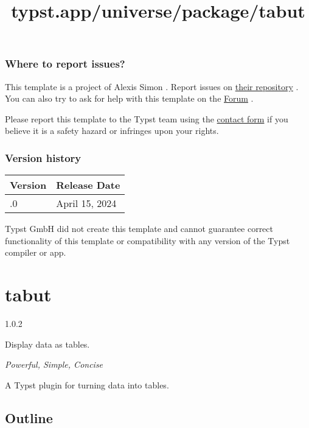 \subsubsection{Where to report issues?}\label{where-to-report-issues}

This template is a project of Alexis Simon . Report issues on
\href{https://codeberg.org/alxsim/superb-pci}{their repository} . You
can also try to ask for help with this template on the
\href{https://forum.typst.app}{Forum} .

Please report this template to the Typst team using the
\href{https://typst.app/contact}{contact form} if you believe it is a
safety hazard or infringes upon your rights.

\label{versions}
\subsubsection{Version history}\label{version-history}

\begin{longtable}[]{@{}ll@{}}
\toprule\noalign{}
Version & Release Date \\
\midrule\noalign{}
\endhead
\bottomrule\noalign{}
\endlastfoot
0.1.0 & April 15, 2024 \\
\end{longtable}

Typst GmbH did not create this template and cannot guarantee correct
functionality of this template or compatibility with any version of the
Typst compiler or app.


\title{typst.app/universe/package/tabut}

\label{banner}
\section{tabut}\label{tabut}

{ 1.0.2 }

Display data as tables.

\label{readme}
\emph{Powerful, Simple, Concise}

A Typst plugin for turning data into tables.

\subsection{Outline}\label{outline}

